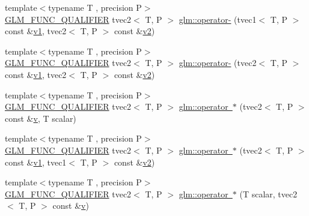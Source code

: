 \begin{DoxyCompactItemize}
\item 
{\footnotesize template$<$typename T , precision P$>$ }\\\mbox{\hyperlink{setup_8hpp_a33fdea6f91c5f834105f7415e2a64407}{G\+L\+M\+\_\+\+F\+U\+N\+C\+\_\+\+Q\+U\+A\+L\+I\+F\+I\+ER}} tvec2$<$ T, P $>$ \mbox{\hyperlink{namespaceglm_ae7e956b07094844e16c22432ac4cdaa5}{glm\+::operator-\/}} (tvec1$<$ T, P $>$ const \&\mbox{\hyperlink{glad_8h_a0779c3b73f9aa3a0ac5b0139b5d291d9}{v1}}, tvec2$<$ T, P $>$ const \&\mbox{\hyperlink{glad_8h_a9a09a1837922b2b806f4589096a52049}{v2}})
\item 
{\footnotesize template$<$typename T , precision P$>$ }\\\mbox{\hyperlink{setup_8hpp_a33fdea6f91c5f834105f7415e2a64407}{G\+L\+M\+\_\+\+F\+U\+N\+C\+\_\+\+Q\+U\+A\+L\+I\+F\+I\+ER}} tvec2$<$ T, P $>$ \mbox{\hyperlink{namespaceglm_ae1123b7aea361ea895859b4c51df5833}{glm\+::operator-\/}} (tvec2$<$ T, P $>$ const \&\mbox{\hyperlink{glad_8h_a0779c3b73f9aa3a0ac5b0139b5d291d9}{v1}}, tvec2$<$ T, P $>$ const \&\mbox{\hyperlink{glad_8h_a9a09a1837922b2b806f4589096a52049}{v2}})
\item 
{\footnotesize template$<$typename T , precision P$>$ }\\\mbox{\hyperlink{setup_8hpp_a33fdea6f91c5f834105f7415e2a64407}{G\+L\+M\+\_\+\+F\+U\+N\+C\+\_\+\+Q\+U\+A\+L\+I\+F\+I\+ER}} tvec2$<$ T, P $>$ \mbox{\hyperlink{namespaceglm_aebb209f572c7a92c8d5d53793086dff9}{glm\+::operator $\ast$}} (tvec2$<$ T, P $>$ const \&\mbox{\hyperlink{glad_8h_a14cfbe2fc2234f5504618905b69d1e06}{v}}, T scalar)
\item 
{\footnotesize template$<$typename T , precision P$>$ }\\\mbox{\hyperlink{setup_8hpp_a33fdea6f91c5f834105f7415e2a64407}{G\+L\+M\+\_\+\+F\+U\+N\+C\+\_\+\+Q\+U\+A\+L\+I\+F\+I\+ER}} tvec2$<$ T, P $>$ \mbox{\hyperlink{namespaceglm_a65fee47f41e7ee2a05579aec8c0b329d}{glm\+::operator $\ast$}} (tvec2$<$ T, P $>$ const \&\mbox{\hyperlink{glad_8h_a0779c3b73f9aa3a0ac5b0139b5d291d9}{v1}}, tvec1$<$ T, P $>$ const \&\mbox{\hyperlink{glad_8h_a9a09a1837922b2b806f4589096a52049}{v2}})
\item 
{\footnotesize template$<$typename T , precision P$>$ }\\\mbox{\hyperlink{setup_8hpp_a33fdea6f91c5f834105f7415e2a64407}{G\+L\+M\+\_\+\+F\+U\+N\+C\+\_\+\+Q\+U\+A\+L\+I\+F\+I\+ER}} tvec2$<$ T, P $>$ \mbox{\hyperlink{namespaceglm_ae46481eed8fe66c3af119231436338a2}{glm\+::operator $\ast$}} (T scalar, tvec2$<$ T, P $>$ const \&\mbox{\hyperlink{glad_8h_a14cfbe2fc2234f5504618905b69d1e06}{v}})

\end{DoxyCompactItemize}
